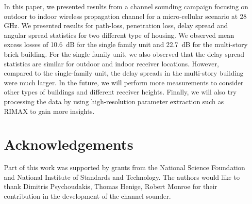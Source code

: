 \documentclass[conference]{IEEEtran}
\begin{document}
In this paper, we presented results from a channel sounding campaign focusing on outdoor to indoor wireless propagation channel for a micro-cellular scenario at 28 GHz. We presented results for path-loss, penetration loss, delay spread and angular spread statistics for two different type of housing. We observed mean excess losses of \SI{10.6}{dB} for the single family unit and \SI{22.7}{dB} for the multi-story brick building. For the single-family unit, we also observed that the delay spread statistics are similar for outdoor and indoor receiver locations. However, compared to the single-family unit, the delay spreads in the multi-story building were much larger. In the future, we will perform more measurements to consider other types of buildings and different receiver heights. Finally, we will also try processing the data by using high-resolution parameter extraction such as RIMAX to gain more insights.


\section*{Acknowledgements}
Part of this work was supported by grants from the National Science Foundation and National Institute of Standards and Technology. The authors would like to thank Dimitris Psychoudakis, Thomas Henige, Robert Monroe for their contribution in the development of the channel sounder.



\end{document}
